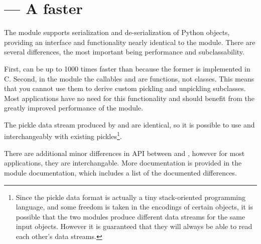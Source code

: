 \section{ --- A faster }


The  module supports serialization and
de-serialization of Python objects, providing an interface and
functionality nearly identical to the
 module.  There are several
differences, the most important being performance and subclassability.

First,  can be up to 1000 times faster than
 because the former is implemented in C.  Second, in
the  module the callables  and
 are functions, not classes.  This means that
you cannot use them to derive custom pickling and unpickling
subclasses.  Most applications have no need for this functionality and
should benefit from the greatly improved performance of the
 module.

The pickle data stream produced by  and
 are identical, so it is possible to use
 and  interchangeably with existing
pickles\footnote{Since the pickle data format is actually a tiny
stack-oriented programming language, and some freedom is taken in the
encodings of certain objects, it is possible that the two modules
produce different data streams for the same input objects.  However it
is guaranteed that they will always be able to read each other's
data streams.}.

There are additional minor differences in API between 
and , however for most applications, they are
interchangable.  More documentation is provided in the
 module documentation, which
includes a list of the documented differences.


